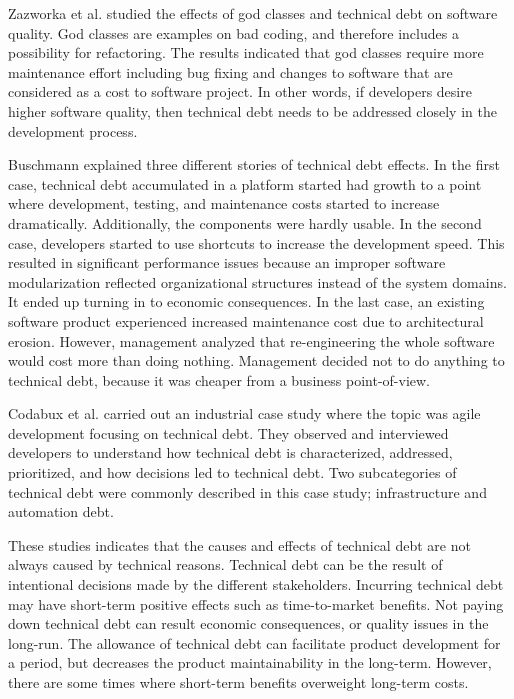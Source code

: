 Zazworka et al.\cite{zazworka2011investigating} studied the effects of god classes and technical debt on software quality. God classes are examples on bad coding, and therefore includes a possibility for refactoring\cite{Zazworka:2011:PDD:1985362.1985372}. The results indicated that god classes require more maintenance effort including bug fixing and changes to software that are considered as a cost to software project. In other words, if developers desire higher software quality, then technical debt needs to be addressed closely in the development process.

Buschmann\cite{buschmann2011pay} explained three different stories of technical debt effects. In the first case, technical debt accumulated in a platform started had growth to a point where development, testing, and maintenance costs started to increase dramatically. Additionally, the components were hardly usable. In the second case, developers started to use shortcuts to increase the development speed. This resulted in significant performance issues because an improper software modularization reflected organizational structures instead of the system domains. It ended up turning in to economic consequences. In the last case, an existing software product experienced increased maintenance cost due to architectural erosion. However, management analyzed that re-engineering the whole software would cost more than doing nothing. Management decided not to do anything to technical debt, because it was cheaper from a business point-of-view.

Codabux et al.\cite{p8-codabux} carried out an industrial case study where the topic was agile development focusing on technical debt. They observed and interviewed developers to understand how technical debt is characterized, addressed, prioritized, and how decisions led to technical debt. Two subcategories of technical debt were commonly described in this case study; infrastructure and automation debt. 

These studies indicates that the causes and effects of technical debt are not always caused by technical reasons. Technical debt can be the result of intentional decisions made by the different stakeholders. Incurring technical debt may have short-term positive effects such as time-to-market benefits. Not paying down technical debt can result economic consequences, or quality issues in the long-run. The allowance of technical debt can facilitate product development for a period, but decreases the product maintainability in the long-term. However, there are some times where short-term benefits overweight long-term costs\cite{guo2011tracking}. 


